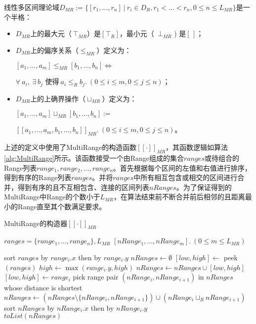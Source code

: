 \begin{definition}
	线性多区间理论域$ D_{MR}  := \{ [r_1, \dots, r_n] \ | \ r_i \in D_R,  r_1 < \dots < r_n, 0 \le n \le L_{MR} \}$是一个半格：
	\begin{itemize}
		\item $ D_{MR} $上的最大元（$\, \top_{MR} $）是$ [\top_R] $，最小元（\, $ \bot_{MR} $ ) 是$ [\,] $；
		
		\item $ D_{MR} $上的偏序关系（$ \le_{MR} $）定义为：\\
			\centerline{$[a_1, \dots, a_m] \le_{MR} [b_1, \dots, b_n] \iff$}
			\centerline{$ \forall \ a_i, \ \exists\  b_j \text{ 使得} \ a_i \le_R b_j .\  (0 \le i \le m, 0 \le j \le n)$；}
			
		\item $ D_{MR} $上的上确界操作（$ \sqcup_{MR} $）定义为：\\
			\centerline{$ [a_1, \dots, a_m] \sqcup_{MR} [b_1, \dots, b_n]  := $}
			\centerline{$ [[a_1, \dots, a_m, b_1, \dots, b_n]]_{MR} .\  (0 \le i \le m, 0 \le j \le n)$。}
	\end{itemize}
	
\end{definition}

上述的定义中使用了MultiRange的构造函数$ [[\cdot]]_{MR} $，其函数逻辑如算法\ref{alg:MultiRange}所示。该函数接受一个由Range组成的集合$ ranges $或待组合的Range列表$ range_1, range_2, \dots, range_n $。首先根据每个区间的左值和右值进行排序，得到有序的Range列表$ ranges $。并将$ ranges $中所有相互包含或相交的区间进行合并，得到有序的且不互相包含、连接的区间列表$ nRanges $。为了保证得到的MultiRange中Range的个数小于$ L_{MR} $，在算法结束前不断合并前后相邻的且距离最小的Range直至其个数满足要求。

\begin{breakablealgorithm}
	\caption{MultiRange的构造器$ [[\cdot]]_{MR} $}
	\label{alg:MultiRange}
	\begin{algorithmic}[1]
		
		\Require $ ranges = \{range_1, \dots, range_n\}, L_{MR} $
		\Ensure $ [nRange_1, \dots, nRange_m]. \ (0 \le m \le L_{MR})$
		
		\State sort $ ranges $ by $ range_{i}.x $ then by $ range_{i}.y $
		\State $ nRanges \gets \emptyset$
		\State $ [low, high] \gets$ peek$ (ranges) $
				\State $ high \gets \max(range_i.y, high) $
			\Else
				\State $ nRanges \gets nRanges \cup [low, high] $
				\State $ [low, high] \gets range_i $
			\EndIf
		\EndFor
			\State pick range pair $ (nRange_i, nRange_{i+1} )$ in $ nRanges $ whose distance is shortest
			\State $ nRanges \gets (nRanges \setminus\{nRange_i, nRange_{i+1}\}) \cup (nRange_i \sqcup_R nRange_{i+1}) $
			\State sort $ nRanges $ by $ nRange_{i}.x $ then by $ nRange_{i}.y $
		\EndWhile
		\\\Return $ toList(nRanges) $
		
	\end{algorithmic}
\end{breakablealgorithm}

